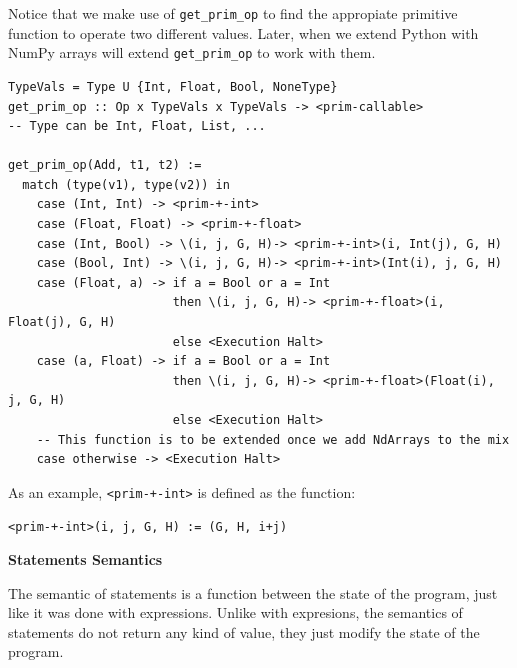 \documentclass[
11pt, %
english, %
singlespacing, %
headsepline, %
]{MastersDoctoralThesis} %
\newcommand{\nonsection}[1]{\vspace{3mm}\noindent\textbf{\large #1}\vspace{2mm}}
\begin{document}
Notice that we make use of \texttt{get\_prim\_op} to find the appropiate
primitive function to operate two different values. Later, when we
extend Python with NumPy arrays will extend \texttt{get\_prim\_op} to
work with them.

\begin{verbatim}
TypeVals = Type U {Int, Float, Bool, NoneType}
get_prim_op :: Op x TypeVals x TypeVals -> <prim-callable>
-- Type can be Int, Float, List, ...

get_prim_op(Add, t1, t2) :=
  match (type(v1), type(v2)) in
    case (Int, Int) -> <prim-+-int>
    case (Float, Float) -> <prim-+-float>
    case (Int, Bool) -> \(i, j, G, H)-> <prim-+-int>(i, Int(j), G, H)
    case (Bool, Int) -> \(i, j, G, H)-> <prim-+-int>(Int(i), j, G, H)
    case (Float, a) -> if a = Bool or a = Int
                       then \(i, j, G, H)-> <prim-+-float>(i, Float(j), G, H)
                       else <Execution Halt>
    case (a, Float) -> if a = Bool or a = Int
                       then \(i, j, G, H)-> <prim-+-float>(Float(i), j, G, H)
                       else <Execution Halt>
    -- This function is to be extended once we add NdArrays to the mix
    case otherwise -> <Execution Halt>
\end{verbatim}

As an example, \texttt{\textless{}prim-+-int\textgreater{}} is defined
as the function:

\texttt{\textless{}prim-+-int\textgreater{}(i,\ j,\ G,\ H)\ :=\ (G,\ H,\ i+j)}

{\nonsection{Statements Semantics}}

The semantic of statements is a function between the state of the
program, just like it was done with expressions. Unlike with expresions,
the semantics of statements do not return any kind of value, they just
modify the state of the program.
\end{document}
